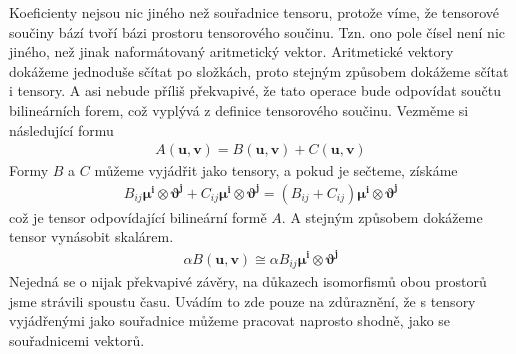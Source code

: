 \documentclass[a5paper,12pt]{amsbook}
\theoremstyle{definition}
\newcommand{\myvec}[1]{\bm{#1}}
\begin{document}
Koeficienty nejsou nic jiného než souřadnice tensoru, protože víme, že tensorové
součiny bází tvoří bázi prostoru tensorového součinu. Tzn. ono pole čísel není
nic jiného, než jinak naformátovaný aritmetický vektor. Aritmetické vektory
dokážeme jednoduše sčítat po složkách, proto stejným způsobem dokážeme sčítat
i tensory. A asi nebude příliš překvapivé, že tato operace bude odpovídat součtu
bilineárních forem, což vyplývá z definice tensorového součinu. Vezměme si následující
formu
\begin{equation*}
\begin{split}
A(\myvec{u}, \myvec{v}) = B(\myvec{u}, \myvec{v}) + C(\myvec{u}, \myvec{v})
\end{split}
\end{equation*}
Formy $B$ a $C$ můžeme vyjádřit jako tensory, a pokud je sečteme, získáme
\begin{equation*}
\begin{split}
B_{ij}\myvec{\mu^i}\otimes\myvec{\vartheta^j} + C_{ij}\myvec{\mu^i}\otimes\myvec{\vartheta^j}
  = \left(B_{ij} + C_{ij}\right)\myvec{\mu^i}\otimes\myvec{\vartheta^j}
\end{split}
\end{equation*}
což je tensor odpovídající bilineární formě $A$. A stejným způsobem dokážeme
tensor vynásobit skalárem.
\begin{equation*}
\begin{split}
\alpha B(\myvec{u}, \myvec{v}) \cong \alpha B_{ij}\myvec{\mu^i}\otimes\myvec{\vartheta^j}
\end{split}
\end{equation*}
Nejedná se o nijak překvapivé závěry, na důkazech isomorfismů obou prostorů jsme strávili
spoustu času. Uvádím to zde pouze na zdůraznění, že s tensory vyjádřenými jako souřadnice
můžeme pracovat naprosto shodně, jako se souřadnicemi vektorů.
\end{document}
